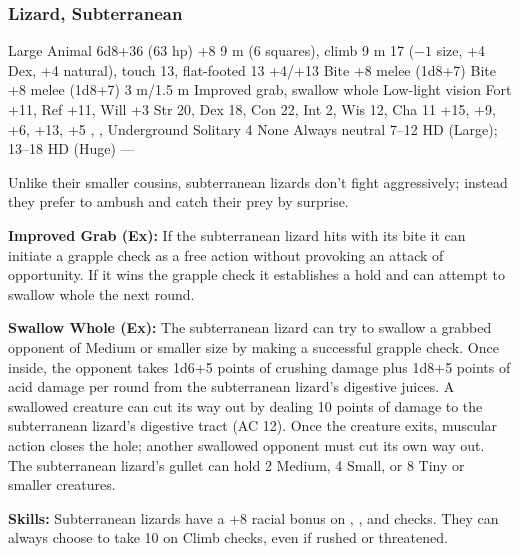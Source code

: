\subsubsection{Lizard, Subterranean}
\begin{MonsterStats}
{Large Animal}
{6d8+36 (63 hp)}
{+8}
{9 m (6 squares), climb 9 m}
{17 ($-1$ size, +4 Dex, +4 natural), touch 13, flat-footed 13}
{+4/+13}
{Bite +8 melee (1d8+7)}
{Bite +8 melee (1d8+7)}
{3 m/1.5 m}
{Improved grab, swallow whole}
{Low-light vision}
{Fort +11, Ref +11, Will +3}
{Str 20, Dex 18, Con 22, Int 2, Wis 12, Cha 11}
{ +15,  +9,  +6,  +13,  +5}
{, , }
{Underground}
{Solitary}
{4}
{None}
{Always neutral}
{7--12 HD (Large); 13--18 HD (Huge)}
{---}
\end{MonsterStats}


Unlike their smaller cousins, subterranean lizards don't fight aggressively; instead they prefer to ambush and catch their prey by surprise.

\textbf{Improved Grab (Ex):} If the subterranean lizard hits with its bite it can initiate a grapple check as a free action without provoking an attack of opportunity. If it wins the grapple check it establishes a hold and can attempt to swallow whole the next round.

\textbf{Swallow Whole (Ex):} The subterranean lizard can try to swallow a grabbed opponent of Medium or smaller size by making a successful grapple check. Once inside, the opponent takes 1d6+5 points of crushing damage plus 1d8+5 points of acid damage per round from the subterranean lizard's digestive juices. A swallowed creature can cut its way out by dealing 10 points of damage to the subterranean lizard's digestive tract (AC 12). Once the creature exits, muscular action closes the hole; another swallowed opponent must cut its own way out. The subterranean lizard's gullet can hold 2 Medium, 4 Small, or 8 Tiny or smaller creatures.

\textbf{Skills:} Subterranean lizards have a +8 racial bonus on , , and  checks. They can always choose to take 10 on Climb checks, even if rushed or threatened.

